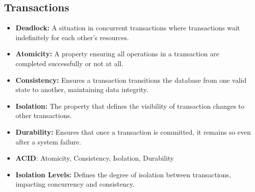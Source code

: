 \vspace{-0.3cm}
\subsection*{Transactions}
\vspace{-0.1cm}

\begin{itemize}[noitemsep,leftmargin=*]
\leftskip-\dimexpr\leftmargin %
\item[]{\textbf{Deadlock:} A situation in concurrent transactions where transactions wait indefinitely for each other's resources.}
\item[]{\textbf{Atomicity:} A property ensuring all operations in a transaction are completed successfully or not at all.}
\item[]{\textbf{Consistency:} Ensures a transaction transitions the database from one valid state to another, maintaining data integrity.}
\item[]{\textbf{Isolation:} The property that defines the visibility of transaction changes to other transactions.}
\item[]{\textbf{Durability:} Ensures that once a transaction is committed, it remains so even after a system failure.}
\item[]{\textbf{ACID}: Atomicity, Consistency, Isolation, Durability}
\item[]{\textbf{Isolation Levels:} Defines the degree of isolation between transactions, impacting concurrency and consistency.}
\end{itemize}
